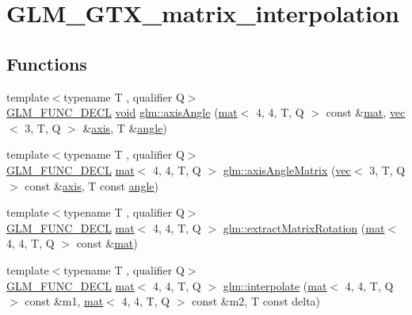 \hypertarget{group__gtx__matrix__interpolation}{}\section{G\+L\+M\+\_\+\+G\+T\+X\+\_\+matrix\+\_\+interpolation}
\label{group__gtx__matrix__interpolation}
\subsection*{Functions}
\begin{DoxyCompactItemize}
\item 
{\footnotesize template$<$typename T , qualifier Q$>$ }\\\mbox{\hyperlink{setup_8hpp_ab2d052de21a70539923e9bcbf6e83a51}{G\+L\+M\+\_\+\+F\+U\+N\+C\+\_\+\+D\+E\+CL}} \mbox{\hyperlink{_s_d_l__opengles2__gl2ext_8h_ae5d8fa23ad07c48bb609509eae494c95}{void}} \mbox{\hyperlink{group__gtx__matrix__interpolation_ga97f160158906ea89676f56cc4697ec98}{glm\+::axis\+Angle}} (\mbox{\hyperlink{structglm_1_1mat}{mat}}$<$ 4, 4, T, Q $>$ const \&\mbox{\hyperlink{structglm_1_1mat}{mat}}, \mbox{\hyperlink{structglm_1_1vec}{vec}}$<$ 3, T, Q $>$ \&\mbox{\hyperlink{group__gtc__quaternion_gaaf2707d3081789ce097daaa6e54d5287}{axis}}, T \&\mbox{\hyperlink{_s_d_l__opengl__glext_8h_a9e06c1f76a20fed54ca742cd25cb02c4}{angle}})
\item 
{\footnotesize template$<$typename T , qualifier Q$>$ }\\\mbox{\hyperlink{setup_8hpp_ab2d052de21a70539923e9bcbf6e83a51}{G\+L\+M\+\_\+\+F\+U\+N\+C\+\_\+\+D\+E\+CL}} \mbox{\hyperlink{structglm_1_1mat}{mat}}$<$ 4, 4, T, Q $>$ \mbox{\hyperlink{group__gtx__matrix__interpolation_ga992a5db71893ed1ba6ebac99f0f69831}{glm\+::axis\+Angle\+Matrix}} (\mbox{\hyperlink{structglm_1_1vec}{vec}}$<$ 3, T, Q $>$ const \&\mbox{\hyperlink{group__gtc__quaternion_gaaf2707d3081789ce097daaa6e54d5287}{axis}}, T const \mbox{\hyperlink{_s_d_l__opengl__glext_8h_a9e06c1f76a20fed54ca742cd25cb02c4}{angle}})
\item 
{\footnotesize template$<$typename T , qualifier Q$>$ }\\\mbox{\hyperlink{setup_8hpp_ab2d052de21a70539923e9bcbf6e83a51}{G\+L\+M\+\_\+\+F\+U\+N\+C\+\_\+\+D\+E\+CL}} \mbox{\hyperlink{structglm_1_1mat}{mat}}$<$ 4, 4, T, Q $>$ \mbox{\hyperlink{group__gtx__matrix__interpolation_ga8834d4499a1a52fcf531b4506f0b5f67}{glm\+::extract\+Matrix\+Rotation}} (\mbox{\hyperlink{structglm_1_1mat}{mat}}$<$ 4, 4, T, Q $>$ const \&\mbox{\hyperlink{structglm_1_1mat}{mat}})
\item 
{\footnotesize template$<$typename T , qualifier Q$>$ }\\\mbox{\hyperlink{setup_8hpp_ab2d052de21a70539923e9bcbf6e83a51}{G\+L\+M\+\_\+\+F\+U\+N\+C\+\_\+\+D\+E\+CL}} \mbox{\hyperlink{structglm_1_1mat}{mat}}$<$ 4, 4, T, Q $>$ \mbox{\hyperlink{group__gtx__matrix__interpolation_gad5fc63a2e084000b39f6508ab07421a5}{glm\+::interpolate}} (\mbox{\hyperlink{structglm_1_1mat}{mat}}$<$ 4, 4, T, Q $>$ const \&m1, \mbox{\hyperlink{structglm_1_1mat}{mat}}$<$ 4, 4, T, Q $>$ const \&m2, T const delta)
\end{DoxyCompactItemize}


